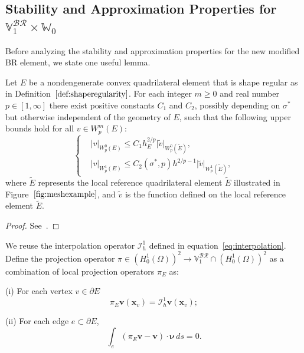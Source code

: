 \subsection{Stability and Approximation Properties for $\mathbb{V}_1^{\mathcal{BR}}\times\mathbb{W}_0$}
\label{sec:stabVbr}
Before analyzing the stability and approximation properties for the new 
modified BR element, we state one useful lemma.
\begin{lem}\label{lem:intestimate}
Let $E$ be a nondengenerate convex quadrilateral element
that is shape regular as in Definition~$\ref{def:shaperegularity}$.
For each integer $m\geq 0$
and real number $p \in [1,\infty]$ there exist positive constants $C_1$
and $C_2$, possibly depending on $\sigma^*$ but otherwise independent of 
 the geometry of $E$, such that the following
upper bounds hold for all $v \in W_p^m(E)$:
\begin{equation}
\left \{  \begin{aligned}
&\lvert v \rvert_{W^0_p(E)} \leq C_1 h_E^{2/p}\lvert \tilde{v} \rvert_{W^0_p(\tilde{E})},\\
		  &\lvert v \rvert_{W^1_p(E)} \leq C_2(\sigma^*,p) h^{2/p-1} \lvert \tilde{v} \rvert_{W^1_p(\tilde{E})},
\end{aligned}
\right.
\end{equation}
where $\tilde{E}$ represents the local reference quadrilateral element $\tilde{E}$ illustrated in Figure~$\ref{fig:meshexample}$, and
$\tilde{v}$ is the function defined on the local reference element $\tilde{E}$.
\end{lem}
\begin{proof}
See~\cite{FinElemMethNavierStokes}. 
\end{proof}

We reuse the interpolation operator $\mathcal{I}_{h}^1$ defined in equation~\eqref{eq:interpolation}.
Define the projection operator $\pi \in (H^1_0(\Omega))^2 \rightarrow \mathbb{V}_1^{\mathcal{BR}} \cap (H^1_0(\Omega))^2$ 
as a combination of local projection operators $\pi_E$ as:

(i) For each vertex $v \in \partial E$
\begin{equation}\label{eq:nodaldof}
		  \pi_E \mathbf{v}(\mathbf{x}_v) = \mathcal{I}^1_{h}\mathbf{v}(\mathbf{x}_v);
\end{equation}

(ii) For each edge $e \subset \partial E$,
\begin{equation}\label{eq:edgedof}
\int_{e} (\pi_E \mathbf{v} - \mathbf{v})\cdot \pmb{\nu}\, ds = 0.
\end{equation}

